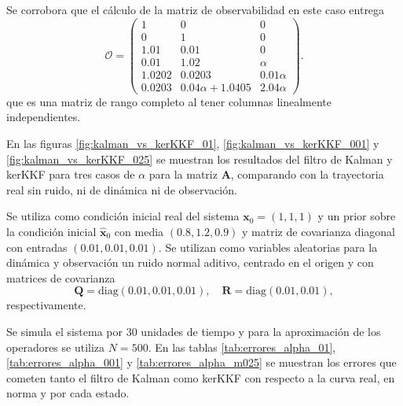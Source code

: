 Se corrobora que el cálculo de la matriz de observabilidad en este caso entrega
\[
\mathcal{O} =
\begin{pmatrix}
1 & 0 & 0 \\
0 & 1 & 0 \\
1.01 & 0.01 & 0 \\
0.01 & 1.02 & \alpha \\
1.0202 & 0.0203 & 0.01\alpha \\
0.0203 & 0.04\alpha + 1.0405 & 2.04\alpha
\end{pmatrix}.
\]
que es una matriz de rango completo al tener columnas linealmente independientes.

En las figuras \ref{fig:kalman_vs_kerKKF_01}, \ref{fig:kalman_vs_kerKKF_001} y \ref{fig:kalman_vs_kerKKF_025} se muestran los resultados del filtro de Kalman y kerKKF para tres casos de $\alpha$ para la matriz $\mathbf{A}$, comparando con la trayectoria real sin ruido, ni de dinámica ni de observación.

Se utiliza como condición inicial real del sistema $\mathbf{x}_0 = (1,1,1)$ y un prior sobre la condición inicial $\hat{\mathbf{x}}_0$ con media $(0.8, 1.2, 0.9)$ y matriz de covarianza diagonal con entradas $(0.01, 0.01, 0.01)$. Se utilizan como variables aleatorias para la dinámica y observación un ruido normal aditivo, centrado en el origen y con matrices de covarianza
\begin{equation*}
    \mathbf{Q} = \text{diag}(0.01, 0.01, 0.01), \quad \mathbf{R} = \text{diag}(0.01, 0.01),
\end{equation*}
respectivamente.

Se simula el sistema por $30$ unidades de tiempo y para la aproximación de los operadores se utiliza $N=500$. En las tablas \ref{tab:errores_alpha_01}, \ref{tab:errores_alpha_001} y \ref{tab:errores_alpha_m025} se muestran los errores que cometen tanto el filtro de Kalman como kerKKF con respecto a la curva real, en norma y por cada estado.



